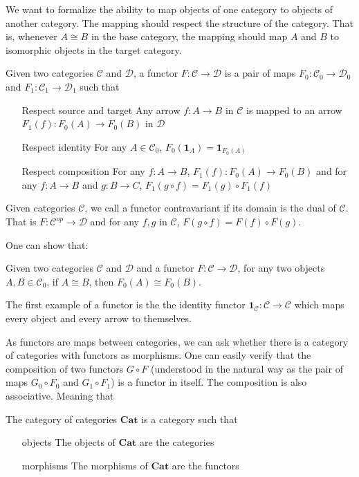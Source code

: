 We want to formalize the ability to map objects of one category to 
objects of another category.
The mapping should respect the structure of the category.
That is, whenever $A\cong B$ in the base category,
the mapping should map $A$ and $B$ to isomorphic objects in the 
target category.
\begin{definition}
    Given two categories $\mathcal{C}$ and $\mathcal{D}$, a functor $F:\mathcal{C}\to\mathcal{D}$ is a pair
    of maps $F_0:\mathcal{C}_0\to\mathcal{D}_0$ and $F_1:\mathcal{C}_1\to\mathcal{D}_1$ such that
    \begin{itemize}
        \item[Respect source and target] Any arrow $f:A\to B$ in $\mathcal{C}$ is mapped to an 
        arrow $F_1(f):F_0(A)\to F_0(B)$ in $\mathcal{D}$
        \item[Respect identity] For any $A\in\mathcal{C}_0$, $F_0(\mathbf{1}_A)=\mathbf{1}_{F_0(A)}$
        \item[Respect composition] For any $f:A\to B$, $F_1(f):F_0(A)\to F_0(B)$
        and for any $f:A\to B$ and $g:B\to C$, $F_1(g\circ f)=F_1(g)\circ F_1(f)$
    \end{itemize}
\end{definition}
\begin{definition}
    Given categories $\mathcal{C}$,
    we call a functor contravariant if its domain is the dual of $\mathcal{C}$.
    That is $F:\mathcal{C}^{op}\to\mathcal{D}$ and for any $f,g$ in $\mathcal{C}$,
    $F(g\circ f)=F(f)\circ F(g)$.
\end{definition}
One can show that:
\begin{lemma}
    Given two categories 
    $\mathcal{C}$ and $\mathcal{D}$ and a 
    functor $F:\mathcal{C}\to\mathcal{D}$,
    for any two objects $A,B\in\mathcal{C}_0$,
    if $A\cong B$, then $F_0(A)\cong F_0(B)$.
\end{lemma}
The first example of a functor is the the identity functor $\mathbf{1}_{\mathcal{C}}:\mathcal{C}\to\mathcal{C}$
which maps every object and every arrow to themselves.

As functors are maps between categories, we can ask whether
there is a category of categories with functors as morphisms.
One can easily verify that the composition of two functors $G\circ F$
(understood in the natural way as the pair of maps $G_0\circ F_0$ and $G_1\circ F_1$) is a functor in itself.
The composition is also associative.
Meaning that
\begin{definition}
    The category of categories $\mathbf{Cat}$ is a category such that
    \begin{itemize}
        \item[objects] The objects of $\mathbf{Cat}$ are the categories
        \item[morphisms] The morphisms of $\mathbf{Cat}$ are the functors
    \end{itemize}
\end{definition}

